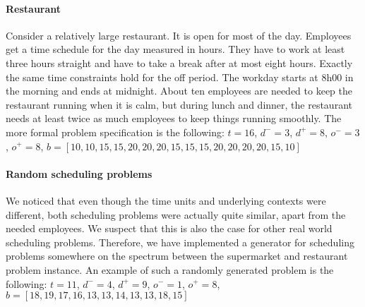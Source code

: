\documentclass[]{article}
\begin{document}
\paragraph{Restaurant}
Consider a relatively large restaurant. It is open for most of the day. Employees get a time schedule for the day measured in hours. They have to work at least three hours straight and have to take a break after at most eight hours. Exactly the same time constraints hold for the off period. The workday starts at 8h00 in the morning and ends at midnight. About ten employees are needed to keep the restaurant running when it is calm, but during lunch and dinner, the restaurant needs at least twice as much employees to keep things running smoothly.
The more formal problem specification is the following:
$t=16$, $d^- = 3$, $d^+ = 8$, $o^- = 3$, $o^+ = 8$, $b = [10,10,15,15,20,20,20,15,15,15,20,20,20,20,15,10]$

\paragraph{Random scheduling problems}
We noticed that even though the time units and underlying contexts were different, both scheduling problems were actually quite similar, apart from the needed employees. We suspect that this is also the case for other real world scheduling problems. Therefore, we have implemented a generator for scheduling problems somewhere on the spectrum between the supermarket and restaurant problem instance. An example of such a randomly generated problem is the following:
$t=11$, $d^- = 4$, $d^+ = 9$, $o^- = 1$, $o^+ = 8$, $b = [18,19,17,16,13,13,14,13,13,18,15]$




\end{document}
